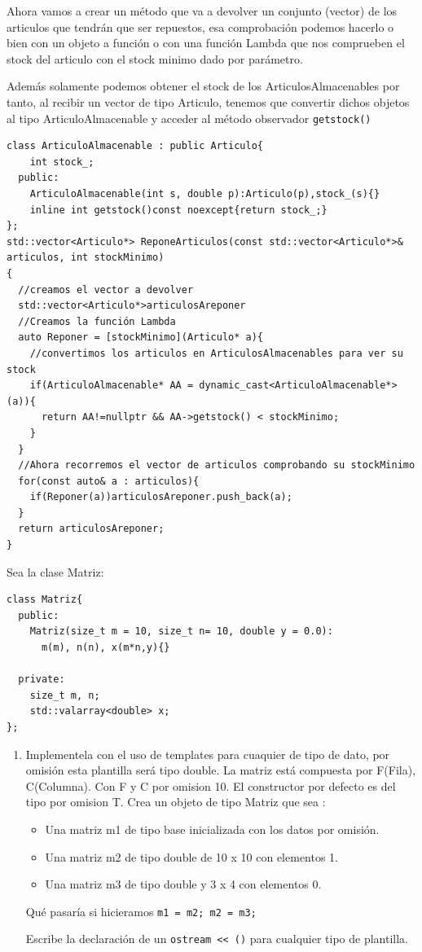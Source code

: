\begin{enumerate}
  Ahora vamos a crear un método que va a devolver un conjunto (vector) de los articulos que tendrán que ser repuestos, esa comprobación podemos hacerlo o bien con un objeto a función o con una función Lambda que nos comprueben el stock del articulo con el stock minimo dado por parámetro.

  Además solamente podemos obtener el stock de los ArticulosAlmacenables por tanto, al recibir un vector de tipo Articulo, tenemos que convertir dichos objetos al tipo ArticuloAlmacenable y acceder al método observador \texttt{getstock()}

\begin{verbatim}
class ArticuloAlmacenable : public Articulo{
    int stock_;
  public:
    ArticuloAlmacenable(int s, double p):Articulo(p),stock_(s){}
    inline int getstock()const noexcept{return stock_;}
};
std::vector<Articulo*> ReponeArticulos(const std::vector<Articulo*>& articulos, int stockMinimo)
{
  //creamos el vector a devolver
  std::vector<Articulo*>articulosAreponer
  //Creamos la función Lambda
  auto Reponer = [stockMinimo](Articulo* a){
    //convertimos los articulos en ArticulosAlmacenables para ver su stock
    if(ArticuloAlmacenable* AA = dynamic_cast<ArticuloAlmacenable*>(a)){
      return AA!=nullptr && AA->getstock() < stockMinimo;
    }
  }
  //Ahora recorremos el vector de articulos comprobando su stockMinimo
  for(const auto& a : articulos){
    if(Reponer(a))articulosAreponer.push_back(a);
  }
  return articulosAreponer;
}
\end{verbatim}
\end{enumerate}
\newpage
{} Sea la clase Matriz:
\begin{center}
  \begin{lstlisting}[frame = single]
class Matriz{
  public:
    Matriz(size_t m = 10, size_t n= 10, double y = 0.0): 
      m(m), n(n), x(m*n,y){}

  private:
    size_t m, n;
    std::valarray<double> x;
};
  \end{lstlisting}
\end{center}

\begin{enumerate}
  \item Implementela con el uso de templates para cuaquier de tipo de dato, por omisión esta plantilla será tipo double. La matriz está compuesta por F(Fila), C(Columna). Con F y C por omision 10. El constructor por defecto es del tipo por omision T. Crea un objeto de tipo Matriz que sea :
  \begin{itemize}
    \item Una matriz m1 de tipo base inicializada con los datos por omisión.
    \item Una matriz m2 de tipo double de 10 x 10 con elementos 1.
    \item Una matriz m3 de tipo double y 3 x 4 con elementos 0.
  \end{itemize}
  Qué pasaría si hicieramos \texttt{m1 = m2; m2 = m3; }

  Escribe la declaración de un \texttt{ostream << ()} para cualquier tipo de plantilla.
\end{enumerate} 

